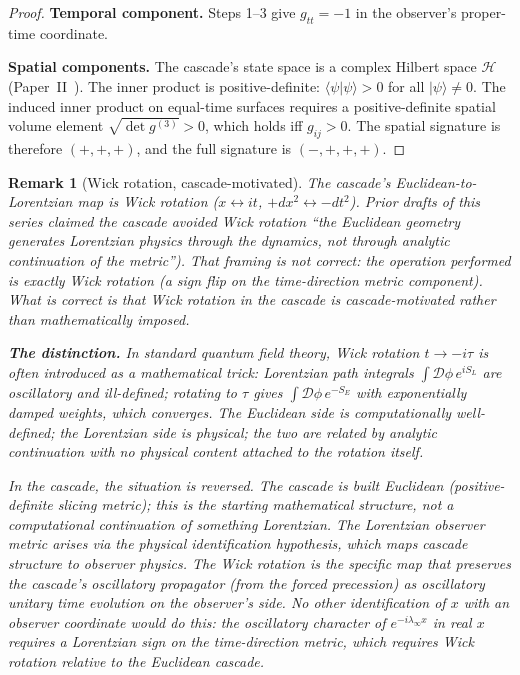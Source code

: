 \documentclass[12pt,a4paper]{article}
\newtheorem*{remark}{Remark}
\begin{document}
\begin{proof}
\textbf{Temporal component.} Steps 1--3 give $g_{tt} = -1$ in the
observer's proper-time coordinate.

\textbf{Spatial components.} The cascade's state space is a complex
Hilbert space $\mathcal{H}$ (Paper~II~\cite{part2}). The inner product
is positive-definite: $\langle\psi|\psi\rangle > 0$ for all
$|\psi\rangle \neq 0$. The induced inner product on equal-time
surfaces requires a positive-definite spatial volume element
$\sqrt{\det g^{(3)}} > 0$, which holds iff $g_{ij} > 0$. The spatial
signature is therefore $(+,+,+)$, and the full signature is
$(-,+,+,+)$.
\end{proof}

\begin{remark}[Wick rotation, cascade-motivated]\label{rem:wick-rotation-cascade}
The cascade's Euclidean-to-Lorentzian map is Wick rotation
($x \leftrightarrow it$, $+dx^2 \leftrightarrow -dt^2$). Prior drafts of
this series claimed the cascade avoided Wick rotation ``the Euclidean
geometry generates Lorentzian physics through the dynamics, not
through analytic continuation of the metric''). That framing is not
correct: the operation performed is exactly Wick rotation (a sign flip
on the time-direction metric component). What is correct is that
Wick rotation in the cascade is \emph{cascade-motivated} rather than
\emph{mathematically imposed}.

\medskip\noindent\textbf{The distinction.}
In standard quantum field theory, Wick rotation $t \to -i\tau$ is
often introduced as a mathematical trick: Lorentzian path integrals
$\int \mathcal{D}\phi\,e^{iS_L}$ are oscillatory and ill-defined;
rotating to $\tau$ gives $\int\mathcal{D}\phi\,e^{-S_E}$ with exponentially
damped weights, which converges. The Euclidean side is computationally
well-defined; the Lorentzian side is physical; the two are related by
analytic continuation with no physical content attached to the
rotation itself.

In the cascade, the situation is reversed. The cascade is \emph{built}
Euclidean (positive-definite slicing metric); this is the starting
mathematical structure, not a computational continuation of something
Lorentzian. The Lorentzian observer metric arises via the physical
identification hypothesis, which maps cascade structure to observer
physics. The Wick rotation is the specific map that preserves the
cascade's oscillatory propagator (from the forced precession) as
oscillatory unitary time evolution on the observer's side. No other
identification of $x$ with an observer coordinate would do this: the
oscillatory character of $e^{-i\lambda_\infty x}$ in real $x$ requires
a Lorentzian sign on the time-direction metric, which requires Wick
rotation relative to the Euclidean cascade.


\end{remark}
\end{document}
